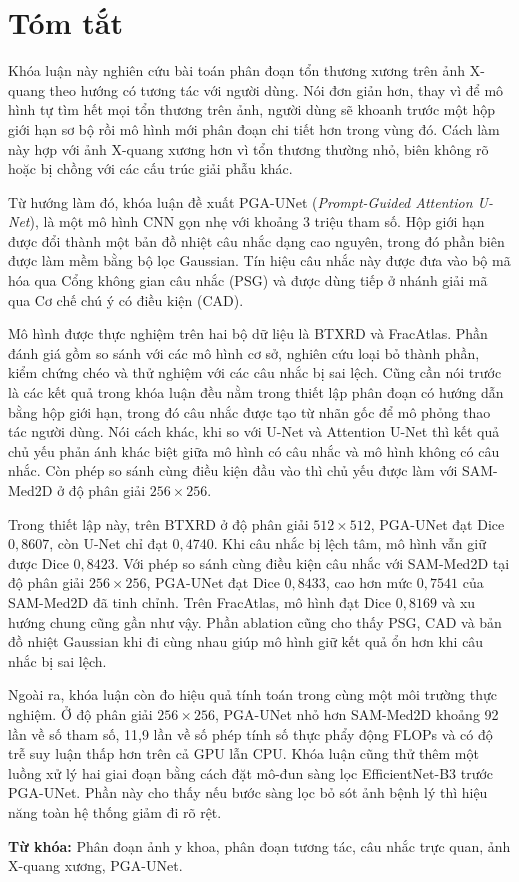 \chapter*{Tóm tắt}

Khóa luận này nghiên cứu bài toán phân đoạn tổn thương xương trên ảnh X-quang theo hướng có tương tác với người dùng. Nói đơn giản hơn, thay vì để mô hình tự tìm hết mọi tổn thương trên ảnh, người dùng sẽ khoanh trước một hộp giới hạn sơ bộ rồi mô hình mới phân đoạn chi tiết hơn trong vùng đó. Cách làm này hợp với ảnh X-quang xương hơn vì tổn thương thường nhỏ, biên không rõ hoặc bị chồng với các cấu trúc giải phẫu khác.

Từ hướng làm đó, khóa luận đề xuất PGA-UNet (\textit{Prompt-Guided Attention U-Net}), là một mô hình CNN gọn nhẹ với khoảng 3 triệu tham số. Hộp giới hạn được đổi thành một bản đồ nhiệt câu nhắc dạng cao nguyên, trong đó phần biên được làm mềm bằng bộ lọc Gaussian. Tín hiệu câu nhắc này được đưa vào bộ mã hóa qua Cổng không gian câu nhắc (PSG) và được dùng tiếp ở nhánh giải mã qua Cơ chế chú ý có điều kiện (CAD).

Mô hình được thực nghiệm trên hai bộ dữ liệu là BTXRD và FracAtlas. Phần đánh giá gồm so sánh với các mô hình cơ sở, nghiên cứu loại bỏ thành phần, kiểm chứng chéo và thử nghiệm với các câu nhắc bị sai lệch. Cũng cần nói trước là các kết quả trong khóa luận đều nằm trong thiết lập phân đoạn có hướng dẫn bằng hộp giới hạn, trong đó câu nhắc được tạo từ nhãn gốc để mô phỏng thao tác người dùng. Nói cách khác, khi so với U-Net và Attention U-Net thì kết quả chủ yếu phản ánh khác biệt giữa mô hình có câu nhắc và mô hình không có câu nhắc. Còn phép so sánh cùng điều kiện đầu vào thì chủ yếu được làm với SAM-Med2D ở độ phân giải $256\times256$.

Trong thiết lập này, trên BTXRD ở độ phân giải $512\times512$, PGA-UNet đạt Dice $0{,}8607$, còn U-Net chỉ đạt $0{,}4740$. Khi câu nhắc bị lệch tâm, mô hình vẫn giữ được Dice $0{,}8423$. Với phép so sánh cùng điều kiện câu nhắc với SAM-Med2D tại độ phân giải $256\times256$, PGA-UNet đạt Dice $0{,}8433$, cao hơn mức $0{,}7541$ của SAM-Med2D đã tinh chỉnh. Trên FracAtlas, mô hình đạt Dice $0{,}8169$ và xu hướng chung cũng gần như vậy. Phần ablation cũng cho thấy PSG, CAD và bản đồ nhiệt Gaussian khi đi cùng nhau giúp mô hình giữ kết quả ổn hơn khi câu nhắc bị sai lệch.

Ngoài ra, khóa luận còn đo hiệu quả tính toán trong cùng một môi trường thực nghiệm. Ở độ phân giải $256\times256$, PGA-UNet nhỏ hơn SAM-Med2D khoảng 92 lần về số tham số, 11,9 lần về số phép tính số thực phẩy động FLOPs và có độ trễ suy luận thấp hơn trên cả GPU lẫn CPU. Khóa luận cũng thử thêm một luồng xử lý hai giai đoạn bằng cách đặt mô-đun sàng lọc EfficientNet-B3 trước PGA-UNet. Phần này cho thấy nếu bước sàng lọc bỏ sót ảnh bệnh lý thì hiệu năng toàn hệ thống giảm đi rõ rệt.

\noindent\textbf{Từ khóa:} Phân đoạn ảnh y khoa, phân đoạn tương tác, câu nhắc trực quan, ảnh X-quang xương, PGA-UNet.
